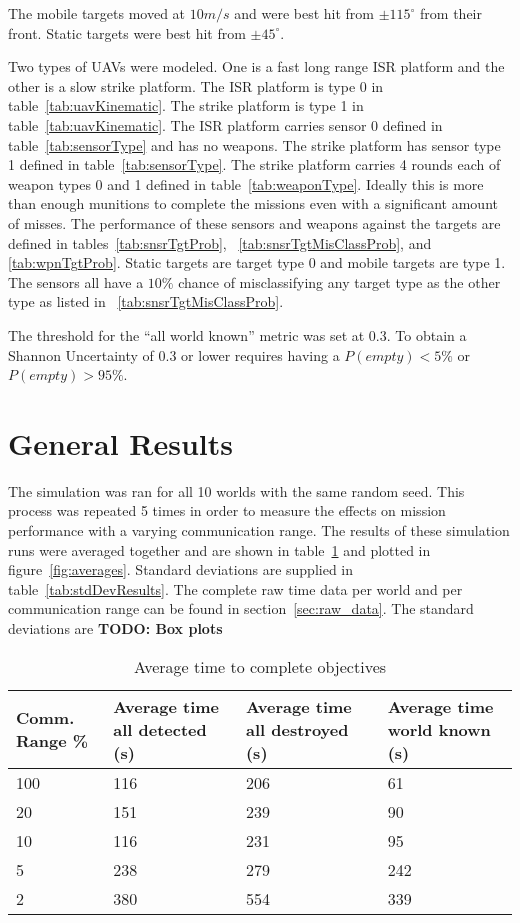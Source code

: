 The mobile targets moved at $10m/s$ and were best hit from $\pm115^{\circ}$ from their front.  Static targets were best hit from $\pm45^{\circ}$.

Two types of UAVs were modeled.  One is a fast long range ISR platform and the other is a slow strike platform.  The ISR platform is type 0 in table~\ref{tab:uavKinematic}.  The strike platform is type 1 in table~\ref{tab:uavKinematic}.  The ISR platform carries sensor 0 defined in table~\ref{tab:sensorType} and has no weapons.  The strike platform has sensor type 1 defined in table~\ref{tab:sensorType}.  The strike platform carries 4 rounds each of weapon types 0 and 1 defined in table~\ref{tab:weaponType}.  Ideally this is more than enough munitions to complete the missions even with a significant amount of misses.  The performance of these sensors and weapons against the targets are defined in tables~\ref{tab:snsrTgtProb}, ~\ref{tab:snsrTgtMisClassProb}, and \ref{tab:wpnTgtProb}.  Static targets are target type 0 and mobile targets are type 1.  The sensors all have a $10\%$ chance of misclassifying any target type as the other type as listed in ~\ref{tab:snsrTgtMisClassProb}.

The threshold for the ``all world known'' metric was set at 0.3. To obtain a Shannon Uncertainty of 0.3 or lower requires having a $P(empty) < 5\%$ or $P(empty) > 95\%$.

\section{General Results}

The simulation was ran for all 10 worlds with the same random seed.  This process was repeated 5 times in order to measure the effects on mission performance with a varying communication range.  The results of these simulation runs were averaged together and are shown in table~\ref{tab:avgResults} and plotted in figure~\ref{fig:averages}.  Standard deviations are supplied in table~\ref{tab:stdDevResults}.  The complete raw time data per world and per communication range can be found in section~\ref{sec:raw_data}.  The standard deviations are \textbf{TODO: Box plots} 

\begin{table}[H]
	\caption{Average time to complete objectives}
	\centering
	\label{tab:avgResults}
	\begin{tabular}{|p{1.25cm}|p{1.5cm}|p{1.75cm}|p{1.5cm}|}
		\hline
		Comm. Range \% & Average time all detected (s) & Average time all destroyed (s) & Average time world known (s)\\
		\hline
		100 & 116 & 206 & 61  \\ \hline
		20  & 151 & 239 & 90  \\ \hline
		10  & 116 & 231 & 95  \\ \hline
		5   & 238 & 279 & 242 \\ \hline
		2   & 380 & 554 & 339 \\ \hline
	\end{tabular}
\end{table}

